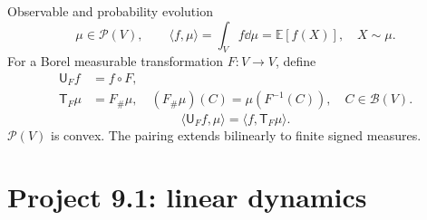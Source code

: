 \documentclass[12pt]{beamer}
\newcommand{\Pp}{\mathcal P}
\begin{document}
\begin{frame}[t]{Observable and probability evolution}
  \begin{equation*}
    \mu\in\Pp(V),\qquad
    \langle f,\mu\rangle=\int_V f\dd\mu=\mathbb E[f(X)],\quad X\sim\mu.
  \end{equation*}
  For a Borel measurable transformation $F:V\to V$, define
  \begin{equation*}
    \begin{aligned}
      \mathsf U_F f&=f\circ F,\\
      \mathsf T_F\mu&=F_\#\mu,\quad
        (F_\#\mu)(C)=\mu(F^{-1}(C)),\quad C\in\mathcal B(V).
    \end{aligned}
  \end{equation*}
  \begin{equation*}
    \boxed{\langle\mathsf U_Ff,\mu\rangle
         =\langle f,\mathsf T_F\mu\rangle.}
  \end{equation*}
  $\Pp(V)$ is convex. The pairing extends bilinearly to finite signed measures.
\end{frame}

\section{Project 9.1: linear dynamics}
\end{document}

